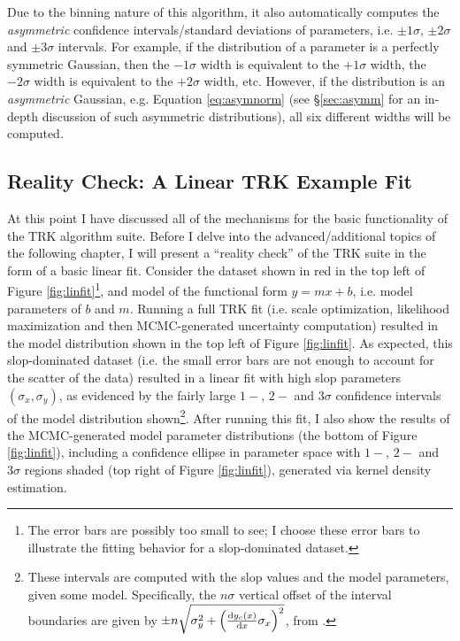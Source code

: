 Due to the binning nature of this algorithm, it also automatically computes the \textit{asymmetric} confidence intervals/standard deviations of parameters, i.e. $\pm1\sigma$, $\pm2\sigma$ and $\pm3\sigma$ intervals. For example, if the distribution of a parameter is a perfectly symmetric Gaussian, then the $-1\sigma$ width is equivalent to the $+1\sigma$ width, the $-2\sigma$ width is equivalent to the $+2\sigma$ width, etc. However, if the distribution is an \textit{asymmetric} Gaussian, e.g. Equation \eqref{eq:asymnorm} (see \S\ref{sec:asymm} for an in-depth discussion of such asymmetric distributions), all six different widths will be computed.

\subsection{Reality Check: A Linear TRK Example Fit}
\label{sec:linfitex}

At this point I have discussed all of the mechanisms for the basic functionality of the TRK algorithm suite. Before I delve into the advanced/additional topics of the following chapter, I will present a ``reality check'' of the TRK suite in the form of a basic linear fit. Consider the dataset shown in red in the top left of Figure \ref{fig:linfit}\footnote{The error bars are possibly too small to see; I choose these error bars to illustrate the fitting behavior for a slop-dominated dataset.}, and model of the functional form $y=mx+b$, i.e. model parameters of $b$ and $m$. Running a full TRK fit (i.e. scale optimization, likelihood maximization and then MCMC-generated uncertainty computation) resulted in the model distribution shown in the top left of Figure \ref{fig:linfit}. As expected, this slop-dominated dataset (i.e. the small error bars are not enough to account for the scatter of the data) resulted in a linear fit with high slop parameters $(\sigma_x, \sigma_y)$, as evidenced by the fairly large $1-$, $2-$ and $3\sigma$ confidence intervals of the model distribution shown\footnote{\label{footnote:modelcurvebands}These intervals are computed with the slop values and the model parameters, given some model. Specifically, the $n\sigma$ vertical offset of the interval boundaries are given by $\pm n\sqrt{\sigma_y^2 + \left(\dv{y_c(x)}{x}\sigma_x\right)^2}$, from \textcite{trotter}.}. After running this fit, I also show the results of the MCMC-generated model parameter distributions (the bottom of Figure \ref{fig:linfit}), including a confidence ellipse in parameter space with $1-$, $2-$ and $3\sigma$ regions shaded (top right of Figure \ref{fig:linfit}), generated via kernel density estimation.

